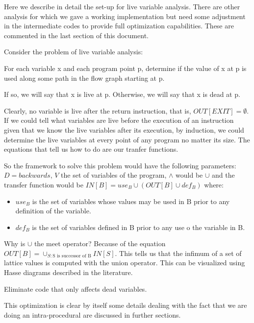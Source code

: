 Here we describe in detail the set-up for live variable analysis. There are other analysis for which we gave a working implementation but need some adjustment in the intermediate codes to provide full optimization capabilities. These are commented in the last section of this document. 

Consider the problem of live variable analysis:

\begin{definition}
For each variable x and each program point p, determine if the value of x at p is used along some path in the flow graph starting at p.

If so, we will say that x is live at p. Otherwise, we will say that x is dead at p. 
\end{definition}

Clearly, no variable is live after the return instruction, that is, $OUT[EXIT] = \emptyset$. If we could tell what variables are live before the execution of an instruction given that we know the live variables after its execution, by induction, we could determine the live variables at every point of any program no matter its size. The equations that tell us how to do are our tranfer functions. 

So the framework to solve this problem would have the following parameters: $D = backwards$, $V$ the set of variables of the program, $\land$ would be $\cup$ and the transfer function would be $IN[B] = use_B \cup (OUT[B] \cup def_B)$ where:

\begin{itemize}
\item $use_B$ is the set of variables whose values may be used in B prior to any definition of the variable. 
\item $def_B$ is the set of variables defined in B prior to any use o the variable in B.
\end{itemize}

Why is $\cup$ the meet operator? Because of the equation $OUT[B] = \cup_{S:\text{S is successor of B}} IN[S]$. This tells us that the infimum of a set of lattice values is computed with the union operator. This can be visualized using Hasse diagrams described in the literature. 

\begin{definition}
Eliminate code that only affects dead variables.
\end{definition}

This optimization is clear by itself some details dealing with the fact that we are doing an intra-procedural are discussed in further sections.



